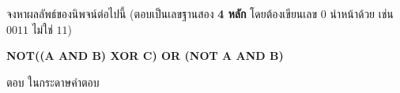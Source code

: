 จงหาผลลัพธ์ของนิพจน์ต่อไปนี้ \newline
(ตอบเป็นเลขฐานสอง \textbf{4 หลัก} โดยต้องเขียนเลข 0 นำหน้าด้วย เช่น $0011$ ไม่ใช่ $11$)

\begin{center}
\textbf{NOT((A AND B) XOR C) OR (NOT A AND B)}
\end{center}

\par\medskip
ตอบ ในกระดาษคำตอบ
